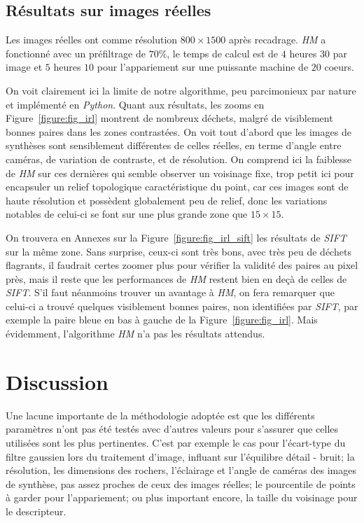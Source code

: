 \documentclass[
	a4paper, %
	10pt, %
	unnumberedsections, %
	twoside, %
]{LTJournalArticle}
\begin{document}
\subsection{Résultats sur images réelles}
Les images réelles ont comme résolution $800 \times 1500$ après recadrage. \textit{HM} a fonctionné
avec un préfiltrage de $70 \%$, le temps de calcul est de $4$ heures $30$ par image et $5$ heures $10$ pour l'appariement sur une
puissante machine de $20$ coeurs.

On voit clairement ici la limite de notre algorithme, peu parcimonieux par nature et implémenté en \textit{Python}.
Quant aux résultats, les zooms en Figure~\ref{figure:fig_irl} montrent de nombreux déchets, malgré de visiblement
bonnes paires dans les zones contrastées.
On voit tout d'abord que les images de synthèses sont sensiblement différentes de celles réelles,
en terme d'angle entre caméras, de variation de contraste, et de résolution.
On comprend ici la faiblesse de \textit{HM} sur ces dernières qui semble observer un voisinage fixe,
trop petit ici pour encapsuler un relief topologique caractéristique du point,
car ces images sont de haute résolution et possèdent globalement peu de relief, donc les
variations notables de celui-ci se font sur une plus grande zone que $15 \times 15$.

On trouvera en Annexes sur la Figure~\ref{figure:fig_irl_sift} les résultats de \textit{SIFT} sur la même zone.
Sans surprise, ceux-ci sont très bons, avec très peu de déchets flagrants, il faudrait certes zoomer plus
pour vérifier la validité des paires au pixel près, mais il reste que les performances de \textit{HM}
restent bien en deçà de celles de \textit{SIFT}. S'il faut néanmoins trouver un avantage à \textit{HM}, on fera
remarquer que celui-ci a trouvé quelques visiblement bonnes paires, non identifiées par \textit{SIFT}, par
exemple la paire bleue en bas à gauche de la Figure~\ref{figure:fig_irl}.
Mais évidemment, l'algorithme \textit{HM} n'a pas les résultats attendus.



\section{Discussion}

Une lacune importante de la méthodologie adoptée est que les différents paramètres
n'ont pas été testés avec d'autres valeurs pour s'assurer que celles
utilisées sont les plus pertinentes.
C'est par exemple le cas pour l'écart-type du filtre gaussien
lors du traitement d'image, influant sur l'équilibre détail - bruit;
la résolution, les dimensions des rochers, l'éclairage et l'angle de caméras des images de synthèse,
pas assez proches de ceux des images réelles;
le pourcentile de points à garder pour l'appariement;
ou plus important encore, la taille du voisinage pour le descripteur.\\
\end{document}
